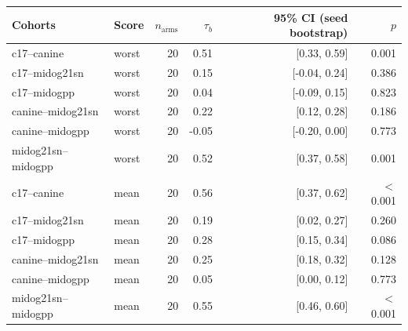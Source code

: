 \begin{tabular}{llrrrr}
\toprule
Cohorts & Score & $n_\text{arms}$ & $\tau_b$ & 95\% CI (seed bootstrap) & $p$ \\
\midrule
c17--canine & worst & 20 & 0.51 & [0.33, 0.59] & 0.001 \\
c17--midog21sn & worst & 20 & 0.15 & [-0.04, 0.24] & 0.386 \\
c17--midogpp & worst & 20 & 0.04 & [-0.09, 0.15] & 0.823 \\
canine--midog21sn & worst & 20 & 0.22 & [0.12, 0.28] & 0.186 \\
canine--midogpp & worst & 20 & -0.05 & [-0.20, 0.00] & 0.773 \\
midog21sn--midogpp & worst & 20 & 0.52 & [0.37, 0.58] & 0.001 \\
c17--canine & mean & 20 & 0.56 & [0.37, 0.62] & $<$0.001 \\
c17--midog21sn & mean & 20 & 0.19 & [0.02, 0.27] & 0.260 \\
c17--midogpp & mean & 20 & 0.28 & [0.15, 0.34] & 0.086 \\
canine--midog21sn & mean & 20 & 0.25 & [0.18, 0.32] & 0.128 \\
canine--midogpp & mean & 20 & 0.05 & [0.00, 0.12] & 0.773 \\
midog21sn--midogpp & mean & 20 & 0.55 & [0.46, 0.60] & $<$0.001 \\
\bottomrule
\end{tabular}
